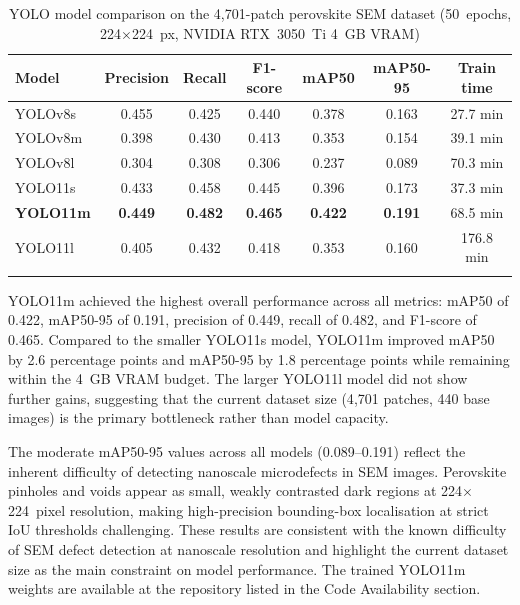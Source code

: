 \documentclass[pdflatex,sn-mathphys-num,iicol]{sn-jnl}
\theoremstyle{thmstyleone}
\theoremstyle{thmstyletwo}
\theoremstyle{thmstylethree}
\begin{document}
\begin{table}[t]
\caption{YOLO model comparison on the 4{,}701-patch perovskite SEM dataset
(50~epochs, 224$\times$224~px, NVIDIA RTX~3050~Ti 4~GB VRAM)}
\label{tab:yolo_results}
\begin{tabular}{@{}lcccccc@{}}
\toprule
Model & Precision & Recall & F1-score & mAP50 & mAP50-95 & Train time \\
\midrule
YOLOv8s  & 0.455 & 0.425 & 0.440 & 0.378 & 0.163 & 27.7 min \\
YOLOv8m  & 0.398 & 0.430 & 0.413 & 0.353 & 0.154 & 39.1 min \\
YOLOv8l  & 0.304 & 0.308 & 0.306 & 0.237 & 0.089 & 70.3 min \\
YOLO11s  & 0.433 & 0.458 & 0.445 & 0.396 & 0.173 & 37.3 min \\
\textbf{YOLO11m} & \textbf{0.449} & \textbf{0.482} & \textbf{0.465} & \textbf{0.422} & \textbf{0.191} & 68.5 min \\
YOLO11l  & 0.405 & 0.432 & 0.418 & 0.353 & 0.160 & 176.8 min \\
\botrule
\end{tabular}
\end{table}

YOLO11m achieved the highest overall performance across all metrics:
mAP50 of 0.422, mAP50-95 of 0.191, precision of 0.449, recall of
0.482, and F1-score of 0.465. Compared to the smaller YOLO11s model,
YOLO11m improved mAP50 by 2.6 percentage points and mAP50-95 by
1.8 percentage points while remaining within the 4~GB VRAM budget.
The larger YOLO11l model did not show further gains, suggesting that
the current dataset size (4{,}701 patches, 440 base images) is the
primary bottleneck rather than model capacity.

The moderate mAP50-95 values across all models (0.089--0.191) reflect
the inherent difficulty of detecting nanoscale microdefects in SEM
images. Perovskite pinholes and voids appear as small, weakly
contrasted dark regions at 224$\times$224~pixel resolution, making
high-precision bounding-box localisation at strict IoU thresholds
challenging. These results are consistent with the known difficulty
of SEM defect detection at nanoscale resolution and highlight the
current dataset size as the main constraint on model performance.
The trained YOLO11m weights are available at the repository listed
in the Code Availability section.
\end{document}
